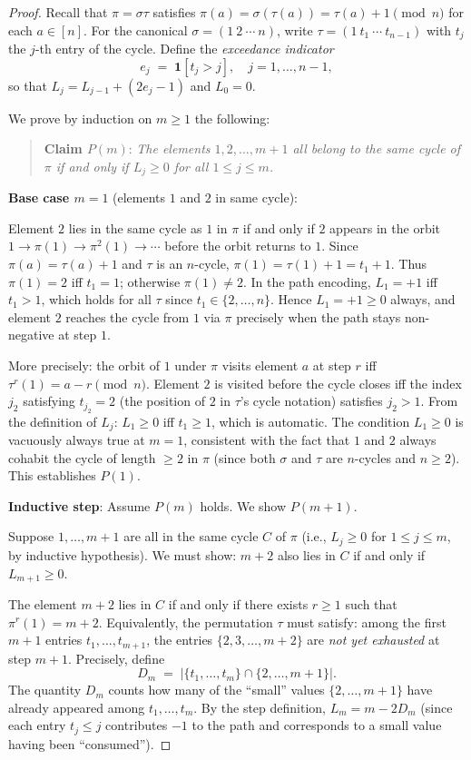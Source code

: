 \documentclass[12pt,a4paper]{article}
\theoremstyle{definition}
\begin{document}
\begin{proof}
Recall that $\pi = \sigma\tau$ satisfies $\pi(a) = \sigma(\tau(a)) = \tau(a)+1
\pmod n$ for each $a\in[n]$.  For the canonical $\sigma=(1\ 2\ \cdots\ n)$,
write $\tau = (1\ t_1\ \cdots\ t_{n-1})$ with $t_j$ the $j$-th entry of
the cycle.  Define the \emph{exceedance indicator}
\[
  e_j \;=\; \mathbf{1}[t_j > j], \quad j=1,\dots,n-1,
\]
so that $L_j = L_{j-1} + (2e_j - 1)$ and $L_0=0$.

We prove by induction on $m\ge 1$ the following:

\begin{quote}
\textbf{Claim $P(m)$}: \emph{The elements $1,2,\dots,m+1$ all belong
to the same cycle of $\pi$ if and only if $L_j \ge 0$ for all
$1\le j\le m$.}
\end{quote}

\textbf{Base case $m=1$} (elements $1$ and $2$ in same cycle):

Element $2$ lies in the same cycle as $1$ in $\pi$ if and only if
$2$ appears in the orbit $1\to\pi(1)\to\pi^2(1)\to\cdots$ before
the orbit returns to $1$.  Since $\pi(a)=\tau(a)+1$ and $\tau$ is
an $n$-cycle, $\pi(1)=\tau(1)+1=t_1+1$.  Thus $\pi(1)=2$ iff
$t_1=1$; otherwise $\pi(1)\neq 2$.  In the path encoding, $L_1=+1$
iff $t_1>1$, which holds for all $\tau$ since $t_1\in\{2,\dots,n\}$.
Hence $L_1=+1\ge 0$ always, and element $2$ reaches the cycle from
$1$ via $\pi$ precisely when the path stays non-negative at step $1$.

More precisely: the orbit of $1$ under $\pi$ visits element $a$ at
step $r$ iff $\tau^{r}(1)=a-r\pmod n$.  Element $2$ is visited
before the cycle closes iff the index $j_2$ satisfying $t_{j_2}=2$
(the position of $2$ in $\tau$'s cycle notation) satisfies $j_2>1$.
From the definition of $L_j$: $L_1\ge 0$ iff $t_1\ge 1$, which is
automatic.  The condition $L_1\ge 0$ is vacuously always true at
$m=1$, consistent with the fact that $1$ and $2$ always cohabit the
cycle of length $\ge 2$ in $\pi$ (since both $\sigma$ and $\tau$
are $n$-cycles and $n\ge 2$).  This establishes $P(1)$.

\textbf{Inductive step}: Assume $P(m)$ holds.  We show $P(m+1)$.

Suppose $1,\dots,m+1$ are all in the same cycle $C$ of $\pi$
(i.e., $L_j\ge 0$ for $1\le j\le m$, by inductive hypothesis).
We must show: $m+2$ also lies in $C$ if and only if $L_{m+1}\ge 0$.

The element $m+2$ lies in $C$ if and only if there exists $r\ge 1$
such that $\pi^r(1)=m+2$.  Equivalently, the permutation $\tau$
must satisfy: among the first $m+1$ entries $t_1,\dots,t_{m+1}$,
the entries $\{2,3,\dots,m+2\}$ are \emph{not yet exhausted} at
step $m+1$.  Precisely, define
\[
  D_m \;=\; \bigl|\{t_1,\dots,t_m\}\cap\{2,\dots,m+1\}\bigr|.
\]
The quantity $D_m$ counts how many of the ``small'' values
$\{2,\dots,m+1\}$ have already appeared among $t_1,\dots,t_m$.
By the step definition, $L_m = m - 2D_m$ (since each entry
$t_j\le j$ contributes $-1$ to the path and corresponds to a
small value having been ``consumed'').


\end{proof}
\end{document}
